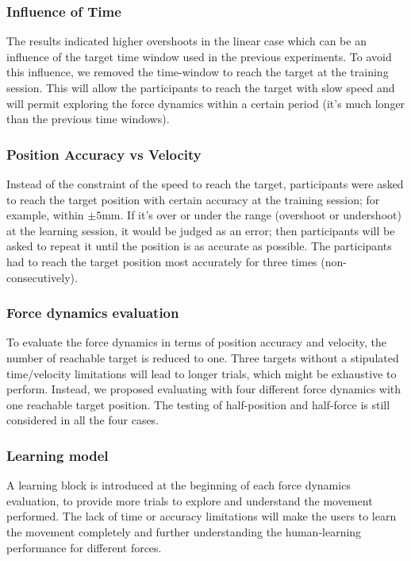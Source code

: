 \subsubsection{Influence of Time} 
The results indicated higher overshoots in the linear case which can be an influence of the target time window used in the previous experiments. To avoid this influence, we removed the time-window to reach the target at the training session. This will allow the participants to reach the target with slow speed and will permit exploring the force dynamics within a certain period (it’s much longer than the previous time windows).

\subsubsection{Position Accuracy vs Velocity} 
Instead of the constraint of the speed to reach the target, participants were asked to reach the target position with certain accuracy at the training session; for example, within $\pm 5$mm. If it’s over or under the range (overshoot or undershoot) at the learning session, it would be judged as an error; then participants will be asked to repeat it until the position is as accurate as possible. The participants had to reach the target position most accurately for three times (non-consecutively).

\subsubsection{Force dynamics evaluation}
To evaluate the force dynamics in terms of position accuracy and velocity, the number of reachable target is reduced to one. Three targets without a stipulated time/velocity limitations will lead to longer trials, which might be exhaustive to perform.  Instead, we proposed evaluating with four different force dynamics with one reachable target position. The testing of half-position and half-force is still considered in all the four cases.

\subsubsection{Learning model}
A learning block is introduced at the beginning of each force dynamics evaluation, to provide more trials to explore and understand the movement performed. The lack of time or accuracy limitations will make the users to learn the movement completely and further understanding the human-learning performance for different forces.

